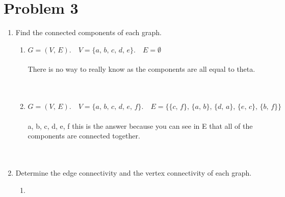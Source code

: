 
\section*{Problem 3}

\begin{enumerate}[label=(\alph*)]
\item Find the connected components of each graph.\\
    \begin{enumerate}[label=(\roman*)]
    \item $G = (V, \,E).\quad V = \{a,\, b,\, c,\, d,\,  e\}.\quad E = \emptyset$\\\\
There is no way to really know as the components are all equal to theta. \\

\\\\
    \item $G = (V,\, E).\quad V = \{a,\, b,\, c,\, d,\, e,\, f\}.\quad E = \{ \{c,\, f\}, \,\{a,\, b\},\, \{d,\, a\}, \,\{e,\, c\},\, \{b,\, f\} \}$\\\\
{a, b, c, d, e, f} this is the answer because you can see in E that all of the components are connected together. \\

\\\\
    \end{enumerate}
\item Determine the edge connectivity and the vertex connectivity of each graph.\\

    \begin{enumerate}[label=(\roman*)]    
 \item
{}
\end{enumerate}
\end{enumerate}
